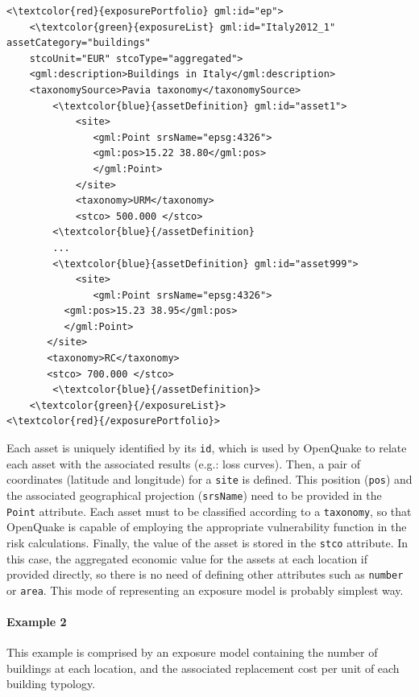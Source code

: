 \begin{Verbatim}[frame=single, commandchars=\\\{\}, samepage=false]
<\textcolor{red}{exposurePortfolio} gml:id="ep">
    <\textcolor{green}{exposureList} gml:id="Italy2012_1" assetCategory="buildings" 
    stcoUnit="EUR" stcoType="aggregated">
    <gml:description>Buildings in Italy</gml:description>
    <taxonomySource>Pavia taxonomy</taxonomySource>
        <\textcolor{blue}{assetDefinition} gml:id="asset1">
            <site>
               <gml:Point srsName="epsg:4326">
               <gml:pos>15.22 38.80</gml:pos>
               </gml:Point>
            </site>
            <taxonomy>URM</taxonomy>
            <stco> 500.000 </stco>
        <\textcolor{blue}{/assetDefinition} 
        ...
        <\textcolor{blue}{assetDefinition} gml:id="asset999">
            <site>
               <gml:Point srsName="epsg:4326">
	      <gml:pos>15.23 38.95</gml:pos>
	      </gml:Point>
	   </site>
	   <taxonomy>RC</taxonomy>
	   <stco> 700.000 </stco>
        <\textcolor{blue}{/assetDefinition}> 
    <\textcolor{green}{/exposureList}>
<\textcolor{red}{/exposurePortfolio}>
\end{Verbatim}

Each asset is uniquely identified by its \Verb+id+, which is used by OpenQuake to relate each asset with the associated results (e.g.: loss curves). Then, a pair of coordinates (latitude and longitude) for a \Verb+site+ is defined. This position (\Verb+pos+) and the associated geographical projection (\Verb+srsName+) need to be provided in the \Verb+Point+ attribute. Each asset must to be classified according to a \Verb+taxonomy+, so that OpenQuake is capable of employing the appropriate vulnerability function in the risk calculations. Finally, the value of the asset is stored in the \Verb+stco+ attribute. In this case, the aggregated economic value for the assets at each location if provided directly, so there is no need of defining other attributes such as \Verb+number+ or \Verb+area+. This mode of representing an exposure model is probably simplest way.\\ 

\paragraph{Example 2}
This example is comprised by an exposure model containing the number of buildings at each location, and the associated replacement cost per unit of each building typology.

